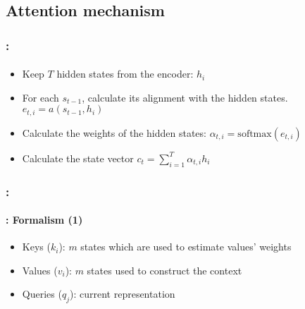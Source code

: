 \documentclass[xcolor=table]{beamer}
\begin{document}
\subsection{Attention mechanism}

\begin{frame}
	\frametitle{\insertshortsubtitle: \insertsection}
	\framesubtitle{\insertsubsection}
	
	\begin{center}
	\end{center}
	
	\vskip-6pt
	\begin{itemize}
		\item Keep $T$ hidden states from the encoder: $h_i$
		\item For each $s_{t-1}$, calculate its alignment with the hidden states.
		$ e_{t, i} = a(s_{t-1}, h_i) $
		\item Calculate the weights of the hidden states: $\alpha_{t, i} = \text{softmax}(e_{t, i})$
		\item Calculate the state vector $c_t = \sum_{i=1}^{T} \alpha_{t, i} h_i$
	\end{itemize}
	
\end{frame}

\begin{frame}
	\frametitle{\insertshortsubtitle: \insertsection}
	\framesubtitle{\insertsubsection: Formalism (1)}
	
	\begin{center}
	\end{center}
	
	\vskip-6pt
	\begin{itemize}
		\item Keys ($k_i$): $m$ states which are used to estimate values' weights
		\item Values ($v_i$): $m$ states used to construct the context 
		\item Queries ($q_j$): current representation 
	\end{itemize}
	
\end{frame}
\end{document}
